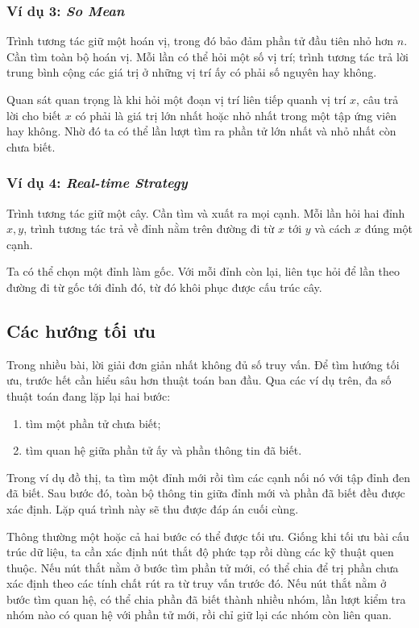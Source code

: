 \documentclass[11pt]{article}
\begin{document}
\subsubsection{Ví dụ 3: \emph{So Mean}}

Trình tương tác giữ một hoán vị, trong đó bảo đảm phần tử đầu tiên nhỏ hơn
$n$. Cần tìm toàn bộ hoán vị. Mỗi lần có thể hỏi một số vị trí; trình tương tác
trả lời trung bình cộng các giá trị ở những vị trí ấy có phải số nguyên hay
không.

Quan sát quan trọng là khi hỏi một đoạn vị trí liên tiếp quanh vị trí $x$, câu
trả lời cho biết $x$ có phải là giá trị lớn nhất hoặc nhỏ nhất trong một tập
ứng viên hay không. Nhờ đó ta có thể lần lượt tìm ra phần tử lớn nhất và nhỏ
nhất còn chưa biết.

\subsubsection{Ví dụ 4: \emph{Real-time Strategy}}

Trình tương tác giữ một cây. Cần tìm và xuất ra mọi cạnh. Mỗi lần hỏi hai đỉnh
$x,y$, trình tương tác trả về đỉnh nằm trên đường đi từ $x$ tới $y$ và cách
$x$ đúng một cạnh.

Ta có thể chọn một đỉnh làm gốc. Với mỗi đỉnh còn lại, liên tục hỏi để lần theo
đường đi từ gốc tới đỉnh đó, từ đó khôi phục được cấu trúc cây.

\subsection{Các hướng tối ưu}

Trong nhiều bài, lời giải đơn giản nhất không đủ số truy vấn. Để tìm hướng tối
ưu, trước hết cần hiểu sâu hơn thuật toán ban đầu. Qua các ví dụ trên, đa số
thuật toán đang lặp lại hai bước:
\begin{enumerate}
  \item tìm một phần tử chưa biết;
  \item tìm quan hệ giữa phần tử ấy và phần thông tin đã biết.
\end{enumerate}

Trong ví dụ đồ thị, ta tìm một đỉnh mới rồi tìm các cạnh nối nó với tập đỉnh
đen đã biết. Sau bước đó, toàn bộ thông tin giữa đỉnh mới và phần đã biết đều
được xác định. Lặp quá trình này sẽ thu được đáp án cuối cùng.

Thông thường một hoặc cả hai bước có thể được tối ưu. Giống khi tối ưu bài cấu
trúc dữ liệu, ta cần xác định nút thắt độ phức tạp rồi dùng các kỹ thuật quen
thuộc. Nếu nút thắt nằm ở bước tìm phần tử mới, có thể chia để trị phần chưa
xác định theo các tính chất rút ra từ truy vấn trước đó. Nếu nút thắt nằm ở
bước tìm quan hệ, có thể chia phần đã biết thành nhiều nhóm, lần lượt kiểm tra
nhóm nào có quan hệ với phần tử mới, rồi chỉ giữ lại các nhóm còn liên quan.
\end{document}
